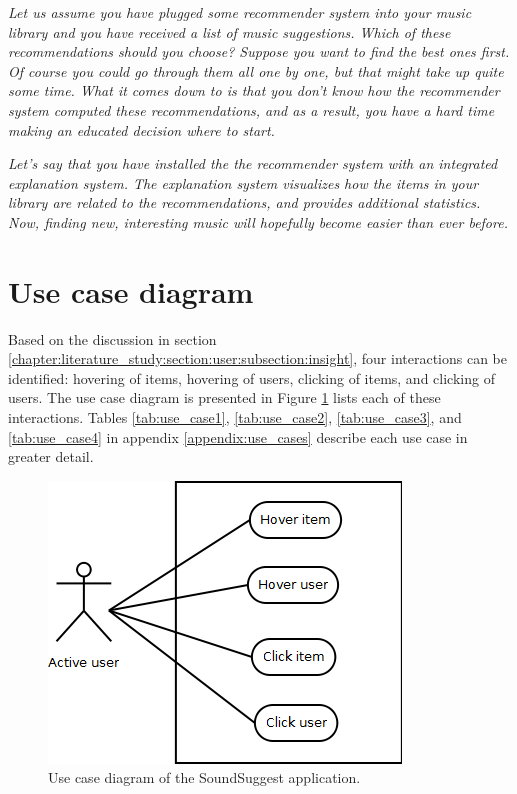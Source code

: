 \textit{Let us assume you have plugged some recommender system into your music library and you have received a list of music suggestions. Which of these recommendations should you choose? Suppose you want to find the best ones first. Of course you could go through them all one by one, but that might take up quite some time. What it comes down to is that you don't know how the recommender system computed these recommendations, and as a result, you have a hard time making an educated decision where to start.}

\textit{Let's say that you have installed the the recommender system with an integrated explanation system. The explanation system visualizes how the items in your library are related to the recommendations, and provides additional statistics. Now, finding new, interesting music will hopefully become easier than ever before.}




\section{Use case diagram}

Based on the discussion in section \ref{chapter:literature_study:section:user:subsection:insight}, four interactions can be identified: hovering of items, hovering of users, clicking of items, and clicking of users. The use case diagram is presented in Figure \ref{fig:use_case_diagram} lists each of these interactions. Tables \ref{tab:use_case1}, \ref{tab:use_case2}, \ref{tab:use_case3}, and \ref{tab:use_case4} in appendix \ref{appendix:use_cases} describe each use case in greater detail.

\begin{figure}
  \begin{center}
  \includegraphics[scale=0.7]{img/usecase_diagram}
	\end{center}
  \caption{Use case diagram of the SoundSuggest application.}
  \label{fig:use_case_diagram}
\end{figure}





